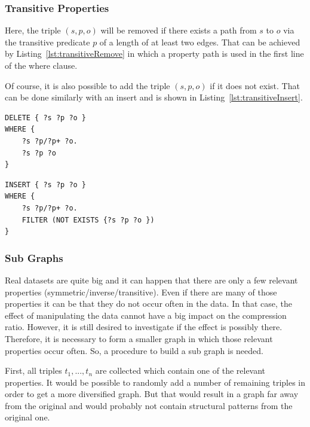 \subsubsection{Transitive Properties}

Here, the triple $(s,p,o)$ will be removed if there exists a path from $s$ to $o$ via the transitive predicate $p$ of a length of at least two edges. That can be achieved by Listing~\ref{lst:transitiveRemove} in which a property path is used in the first line of the where clause.

Of course, it is also possible to add the triple $(s,p,o)$ if it does not exist. That can be done similarly with an insert and is shown in Listing~\ref{lst:transitiveInsert}.

\begin{lstlisting}[captionpos=b, caption=SPARQL update for removing triples with the transitive property p., label=lst:transitiveRemove,
basicstyle=\ttfamily,frame=single,float=hbt,]
DELETE { ?s ?p ?o }
WHERE { 
	?s ?p/?p+ ?o. 
	?s ?p ?o 
}
\end{lstlisting}


\begin{lstlisting}[captionpos=b, caption=SPARQL update for adding triples with the transitive property p., label=lst:transitiveInsert,
basicstyle=\ttfamily,frame=single,float=hbt,]
INSERT { ?s ?p ?o }
WHERE { 
	?s ?p/?p+ ?o. 
	FILTER (NOT EXISTS {?s ?p ?o })
}
\end{lstlisting}

\subsubsection{Sub Graphs}\label{sec:implementationSubGraphs}

Real datasets are quite big and it can happen that there are only a few relevant properties (symmetric/inverse/transitive). Even if there are many of those properties it can be that they do not occur often in the data. In that case, the effect of manipulating the data cannot have a big impact on the compression ratio. However, it is still desired to investigate if the effect is possibly there. Therefore, it is necessary to form a smaller graph in which those relevant properties occur often. So, a procedure to build a sub graph is needed.

First, all triples $t_1,...,t_n$ are collected which contain one of the relevant properties. It would be possible to randomly add a number of remaining triples in order to get a more diversified graph. But that would result in a graph far away from the original and would probably not contain structural patterns from the original one.

